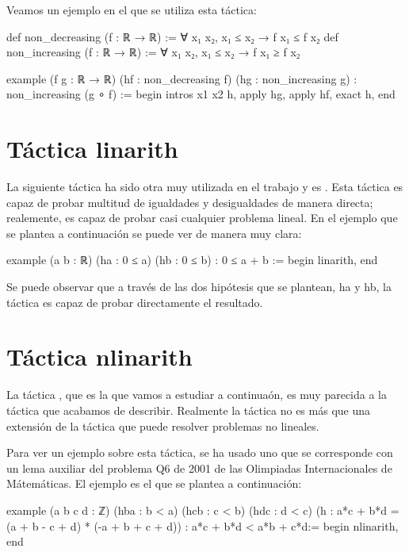 Veamos un ejemplo en el que se utiliza esta táctica:
\begin{leancode}
def non_decreasing (f : ℝ → ℝ) := ∀ x₁ x₂, x₁ ≤ x₂ → f x₁ ≤ f x₂
def non_increasing (f : ℝ → ℝ) := ∀ x₁ x₂, x₁ ≤ x₂ → f x₁ ≥ f x₂

example (f g : ℝ → ℝ) (hf : non_decreasing f) (hg : non_increasing g) :
non_increasing (g ∘ f) :=
begin
  intros x1 x2 h,
  apply hg,
  apply hf,
  exact h,
end
\end{leancode}

\section{Táctica linarith}

La siguiente táctica ha sido otra muy utilizada en el trabajo y es
. Esta táctica es capaz de probar multitud
de igualdades y desigualdades de manera directa; realemente, es capaz de
probar casi cualquier problema lineal. En el ejemplo que se plantea a
continuación se puede ver de manera muy clara:

\begin{leancode}
example (a b : ℝ) (ha : 0 ≤ a) (hb : 0 ≤ b) : 0 ≤ a + b :=
begin
  linarith,
end
\end{leancode}

Se puede observar que a través de las dos hipótesis que se plantean, ha
y hb, la táctica  es capaz de probar
directamente el resultado.

\section{Táctica nlinarith}

La táctica , que es la que vamos a
estudiar a continuaón, es muy parecida a la táctica
 que acabamos de describir. Realmente la
táctica  no es más que una extensión de
la táctica  que puede resolver problemas no
lineales.

Para ver un ejemplo sobre esta táctica, se ha usado uno que se
corresponde con un lema auxiliar del problema Q6 de 2001 de las
Olimpiadas Internacionales de Mátemáticas. El ejemplo es el que se
plantea a continuación:

\begin{leancode}
example (a b c d : ℤ)
  (hba : b < a)
  (hcb : c < b)
  (hdc : d < c)
  (h : a*c + b*d = (a + b - c + d) * (-a + b + c + d))
  : a*c + b*d < a*b + c*d:=
begin
  nlinarith,
end
\end{leancode}

